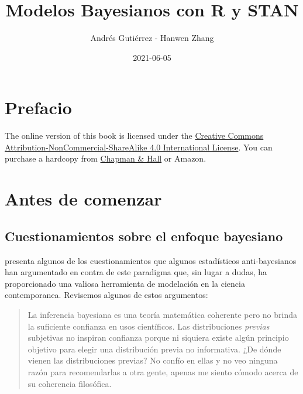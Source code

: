 \documentclass[
  12pt,
  spanish,
]{book}
\title{Modelos Bayesianos con R y STAN}
\author{Andrés Gutiérrez - Hanwen Zhang}
\date{2021-06-05}
\theoremstyle{definition}
\theoremstyle{definition}
\theoremstyle{definition}
\theoremstyle{definition}
\theoremstyle{remark}
\begin{document}
\maketitle

{
\hypersetup{linkcolor=}
\setcounter{tocdepth}{1}
\tableofcontents
}
\listoftables
\listoffigures
\hypertarget{prefacio}{%
\chapter*{Prefacio}\label{prefacio}}

The online version of this book is licensed under the \href{http://creativecommons.org/licenses/by-nc-sa/4.0/}{Creative Commons Attribution-NonCommercial-ShareAlike 4.0 International License}. You can purchase a hardcopy from \href{https://www.crcpress.com/product/isbn/9781138700109}{Chapman \& Hall} or Amazon.

\hypertarget{antes-de-comenzar}{%
\chapter*{Antes de comenzar}\label{antes-de-comenzar}}

\hypertarget{cuestionamientos-sobre-el-enfoque-bayesiano}{%
\section*{Cuestionamientos sobre el enfoque bayesiano}\label{cuestionamientos-sobre-el-enfoque-bayesiano}}

\citet{GelmanObjections} presenta algunos de los cuestionamientos que algunos estadísticos anti-bayesianos han argumentado en contra de este paradigma que, sin lugar a dudas, ha proporcionado una valiosa herramienta de modelación en la ciencia contemporanea. Revisemos algunos de estos argumentos:

\begin{quote}
La inferencia bayesiana es una teoría matemática coherente pero no brinda la suficiente confianza en usos científicos. Las distribuciones \emph{previas} subjetivas no inspiran confianza porque ni siquiera existe algún principio objetivo para elegir una distribución previa no informativa. ¿De dónde vienen las distribuciones previas? No confío en ellas y no veo ninguna razón para recomendarlas a otra gente, apenas me siento cómodo acerca de su coherencia filosófica.
\end{quote}
\end{document}
